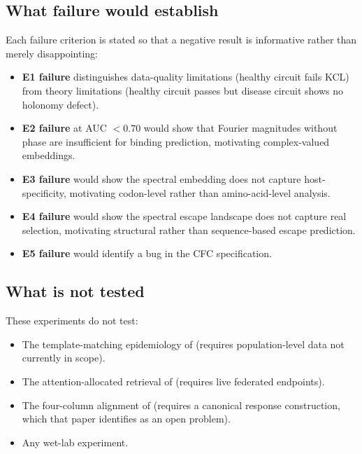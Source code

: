 \documentclass[11pt,a4paper]{article}
\theoremstyle{expthm}
\theoremstyle{definition}
\theoremstyle{remark}
\begin{document}
\subsection{What failure would establish}

Each failure criterion is stated so that a negative result is informative
rather than merely disappointing:

\begin{itemize}[leftmargin=1.4em,itemsep=2pt]
\item \textbf{E1 failure} distinguishes data-quality limitations (healthy
  circuit fails KCL) from theory limitations (healthy circuit passes but
  disease circuit shows no holonomy defect).
\item \textbf{E2 failure} at AUC $< 0.70$ would show that Fourier
  magnitudes without phase are insufficient for binding prediction,
  motivating complex-valued embeddings.
\item \textbf{E3 failure} would show the spectral embedding does not
  capture host-specificity, motivating codon-level rather than
  amino-acid-level analysis.
\item \textbf{E4 failure} would show the spectral escape landscape does
  not capture real selection, motivating structural rather than
  sequence-based escape prediction.
\item \textbf{E5 failure} would identify a bug in the CFC specification.
\end{itemize}

\subsection{What is not tested}

These experiments do not test:
\begin{itemize}[leftmargin=1.4em,itemsep=2pt]
\item The template-matching epidemiology of \citep{sachikonye2026template}
  (requires population-level data not currently in scope).
\item The attention-allocated retrieval of
  \citep{sachikonye2026attention} (requires live federated endpoints).
\item The four-column alignment of \citep{sachikonye2026fourcolumn}
  (requires a canonical response construction, which that paper
  identifies as an open problem).
\item Any wet-lab experiment.
\end{itemize}

\end{document}

